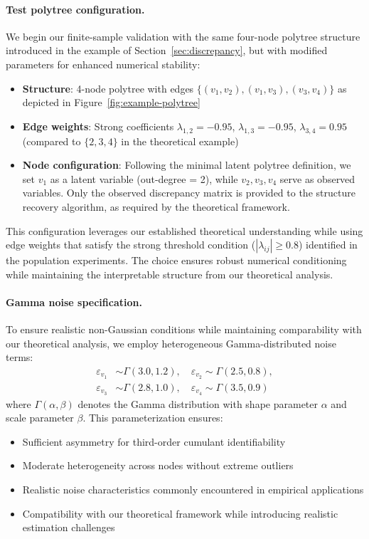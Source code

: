 \documentclass[11pt,a4paper]{article}
\numberwithin{equation}{section}
\begin{document}
\paragraph{Test polytree configuration.} We begin our finite-sample validation with the same four-node polytree structure introduced in the example of Section~\ref{sec:discrepancy}, but with modified parameters for enhanced numerical stability:
\begin{itemize}
\item \textbf{Structure}: 4-node polytree with edges $\{(v_1, v_2), (v_1, v_3), (v_3, v_4)\}$ as depicted in Figure~\ref{fig:example-polytree}
\item \textbf{Edge weights}: Strong coefficients $\lambda_{1,2} = -0.95$, $\lambda_{1,3} = -0.95$, $\lambda_{3,4} = 0.95$ (compared to $\{2, 3, 4\}$ in the theoretical example)
\item \textbf{Node configuration}: Following the minimal latent polytree definition, we set $v_1$ as a latent variable (out-degree = 2), while $v_2, v_3, v_4$ serve as observed variables. Only the observed discrepancy matrix is provided to the structure recovery algorithm, as required by the theoretical framework.
\end{itemize}

This configuration leverages our established theoretical understanding while using edge weights that satisfy the strong threshold condition ($|\lambda_{ij}| \geq 0.8$) identified in the population experiments. The choice ensures robust numerical conditioning while maintaining the interpretable structure from our theoretical analysis.

\paragraph{Gamma noise specification.} To ensure realistic non-Gaussian conditions while maintaining comparability with our theoretical analysis, we employ heterogeneous Gamma-distributed noise terms:
\begin{align}
\varepsilon_{v_1} &\sim \Gamma(3.0, 1.2), \quad \varepsilon_{v_2} \sim \Gamma(2.5, 0.8), \\
\varepsilon_{v_3} &\sim \Gamma(2.8, 1.0), \quad \varepsilon_{v_4} \sim \Gamma(3.5, 0.9)
\end{align}
where $\Gamma(\alpha, \beta)$ denotes the Gamma distribution with shape parameter $\alpha$ and scale parameter $\beta$. This parameterization ensures:
\begin{itemize}
\item Sufficient asymmetry for third-order cumulant identifiability
\item Moderate heterogeneity across nodes without extreme outliers
\item Realistic noise characteristics commonly encountered in empirical applications
\item Compatibility with our theoretical framework while introducing realistic estimation challenges
\end{itemize}
\end{document}
